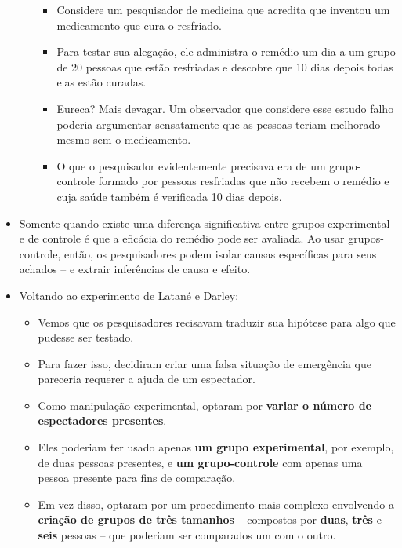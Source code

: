 \documentclass[
]{book}
\providecommand{\tightlist}{%
  \setlength{\itemsep}{0pt}\setlength{\parskip}{0pt}}
\begin{document}
\begin{itemize}
\begin{itemize}
    \begin{itemize}
    \tightlist
    \item
      Considere um pesquisador de medicina que acredita que inventou um medicamento que cura o resfriado.
    \item
      Para testar sua alegação, ele administra o remédio um dia a um grupo de 20 pessoas que estão resfriadas e descobre que 10 dias depois todas elas estão curadas.
    \item
      Eureca? Mais devagar. Um observador que considere esse estudo falho poderia argumentar sensatamente que as pessoas teriam melhorado mesmo sem o medicamento.
    \item
      O que o pesquisador evidentemente precisava era de um grupo-controle formado por pessoas resfriadas que não recebem o remédio e cuja saúde também é verificada 10 dias depois.
    \end{itemize}
  \end{itemize}
\item
  Somente quando existe uma diferença significativa entre grupos experimental e de controle é que a eficácia do remédio pode ser avaliada. Ao usar grupos-controle, então, os pesquisadores podem isolar causas específicas para seus achados -- e extrair inferências de causa e efeito.
\item
  Voltando ao experimento de Latané e Darley:

  \begin{itemize}
  \tightlist
  \item
    Vemos que os pesquisadores recisavam traduzir sua hipótese para algo que pudesse ser testado.
  \item
    Para fazer isso, decidiram criar uma falsa situação de emergência que pareceria requerer a ajuda de um espectador.
  \item
    Como manipulação experimental, optaram por \textbf{variar o número de espectadores presentes}.
  \item
    Eles poderiam ter usado apenas \textbf{um grupo experimental}, por exemplo, de duas pessoas presentes, e \textbf{um grupo-controle} com apenas uma pessoa presente para fins de comparação.
  \item
    Em vez disso, optaram por um procedimento mais complexo envolvendo a \textbf{criação de grupos de três tamanhos} -- compostos por \textbf{duas}, \textbf{três} e \textbf{seis} pessoas -- que poderiam ser comparados um com o outro.
  \end{itemize}
\end{itemize}
\end{document}
